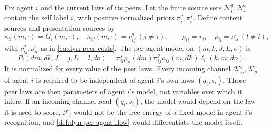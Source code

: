 Fix agent $i$ and the current laws of its peers. Let the finite source sets $\mathcal N_i^q,\mathcal N_i^s$ contain the self label $i$, with positive normalized priors $\pi_i^q,\pi_i^s$. Define content sources and presentation sources by
\begin{equation}
 \kappa_{ii}(m,\cdot)=G_i(m,\cdot),\quad
 \kappa_{ij}(m,\cdot)=\nu^q_{ij}\ (j\neq i),\qquad
 \rho_{ii}=r_i,\quad
 \rho_{il}=\nu^s_{il}\ (l\neq i),
 \label{eq:dyn-mixture-sources}
\end{equation}
with $\nu^q_{ij},\nu^s_{il}$ as in \cref{eq:dyn-peer-costs}. The per-agent model on $(m,k,J,L,o)$ is
\begin{equation}
 P_i(dm,dk,J=j,L=l,do)
 =\pi^s_{il}\rho_{il}(dm)\pi^q_{ij}\kappa_{ij}(m,dk)\ell_i(k,m;do).
 \label{eq:dyn-per-agent-model}
\end{equation}
It is normalized for every value of the peer laws. Every incoming channel $\mathcal K^q_{ij},\mathcal K^s_{il}$ of agent $i$ is required to be independent of agent $i$'s own laws $(q_i,s_i)$. Those peer laws are then parameters of agent $i$'s model, not variables over which it infers. If an incoming channel read $(q_i,s_i)$, the model would depend on the law it is used to score, $\mathcal F_i$ would not be the free energy of a fixed model in agent $i$'s recognition, and \cref{def:dyn-per-agent-flow} would differentiate the model itself.


